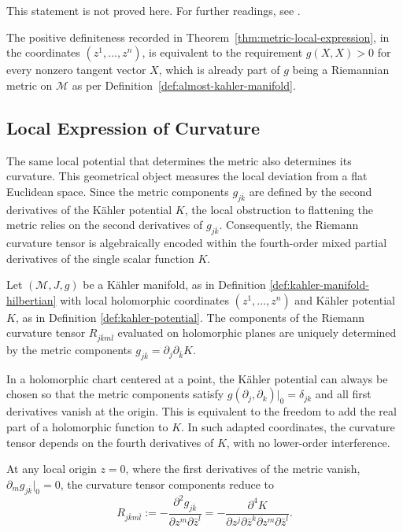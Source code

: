 \noindent This statement is not proved here. For further readings, see \cite[p.58]{Moroianu2004}.

\begin{remark}
	\label{rem:metric-positive-definite}
	The positive definiteness recorded in Theorem~\ref{thm:metric-local-expression}, in the coordinates $(z^1,\dots,z^n)$, is equivalent to the requirement $g(X,X)>0$ for every nonzero tangent vector $X$, which is already part of $g$ being a Riemannian metric on $\mathcal{M}$ as per Definition~\ref{def:almost-kahler-manifold}.
\end{remark}

\subsection*{Local Expression of Curvature}
\noindent The same local potential that determines the metric also determines its curvature. This geometrical object measures the local deviation from a flat Euclidean space. Since the metric components $g_{j\bar{k}}$ are defined by the second derivatives of the Kähler potential $K$, the local obstruction to flattening the metric relies on the second derivatives of $g_{j\bar{k}}$. Consequently, the Riemann curvature tensor is algebraically encoded within the fourth-order mixed partial derivatives of the single scalar function $K$.

\begin{definition}
	\label{def:riemann-curvature}
	Let $(\mathcal{M}, J, g)$ be a Kähler manifold, as in Definition \ref{def:kahler-manifold-hilbertian} with local holomorphic
	coordinates $(z^1, \dots, z^n)$ and Kähler potential $K$, as in Definition \ref{def:kahler-potential}. The components of the Riemann curvature tensor $R_{j\bar{k}m\bar{l}} $ evaluated on holomorphic planes are uniquely determined by the metric components $g_{j\bar{k}} = \partial_j \partial_{\bar{k}} K.$
\end{definition}

\noindent In a holomorphic chart centered at a point, the Kähler potential can always be chosen so that the metric components satisfy \(g(\partial_j, \partial_k)|_0=\delta_{jk}\) and all first derivatives vanish at the origin. This is equivalent to the freedom to add the real part of a holomorphic function to \(K\). In such adapted coordinates, the curvature tensor depends on the fourth derivatives of \(K\), with no lower-order interference.

At any local origin $z=0$, where the first derivatives of the metric vanish, $\partial_m g_{j\bar{k}}|_0 = 0$, the curvature tensor components reduce to
\[
	R_{j\bar{k}m\bar{l}} := -\frac{\partial^2 g_{j\bar{k}}}{\partial z^m \partial \bar{z}^l} = -\frac{\partial^4 K}{\partial z^j \partial \bar{z}^k \partial z^m \partial \bar{z}^l}.
\]

